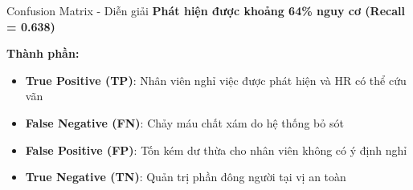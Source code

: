 \begin{frame}{Confusion Matrix - Diễn giải}
  \textbf{Phát hiện được khoảng 64\% nguy cơ (Recall = 0.638)}
  
  \vspace{0.4cm}
  \textbf{Thành phần:}
  \begin{itemize}
    \item \textbf{True Positive (TP)}: Nhân viên nghỉ việc được phát hiện và HR có thể cứu vãn
    \item \textbf{False Negative (FN)}: Chảy máu chất xám do hệ thống bỏ sót
    \item \textbf{False Positive (FP)}: Tốn kém dư thừa cho nhân viên không có ý định nghỉ
    \item \textbf{True Negative (TN)}: Quản trị phần đông người tại vị an toàn
  \end{itemize}
\end{frame}
